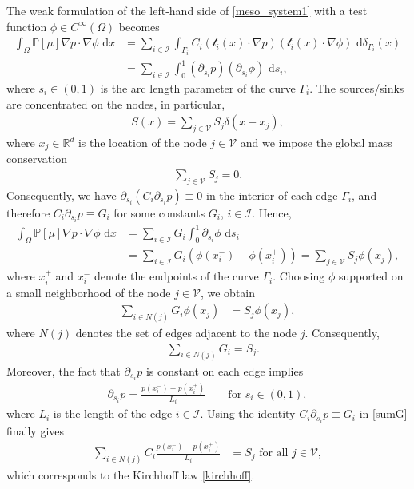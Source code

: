 \documentclass{article}
\numberwithin{equation}{section}
\newcommand{\R}{\mathbb{R}}
\def\[{\begin{eqnarray*}}
\def\]{\end{eqnarray*}}
\def\d{\,\mathrm{d}}
\begin{document}
The weak formulation of the left-hand side of \eqref{meso_system1} with a test function $\phi\in C^\infty(\Omega)$ becomes
\begin{align*}
   \int_\Omega \mathbb{P}[\mu]\nabla p\cdot \nabla \phi\, \d x
      &=\sum_{i\in \mathcal{I}} \int_{\Gamma_i} {C}_i (\mathcal{t}_i(x) \cdot \nabla p) (\mathcal{t}_i(x) \cdot \nabla \phi)\,\d \delta_{\Gamma_i}(x)\\
      &=\sum_{i\in \mathcal{I}} \int_0^1 (\partial_{s_i} p) (\partial_{s_i} \phi) \, \d s_i,
\end{align*}
where $s_i\in(0,1)$ is the arc length parameter of the curve $\Gamma_i$.
The sources/sinks are concentrated on the nodes, in particular,
\[
   S(x) = \sum_{j\in\mathcal{V}} S_j \delta(x-x_j),
\]
where $x_j\in\R^d$ is the location of the node $j\in\mathcal{V}$ and we impose the global mass conservation
\[
   \sum_{j\in\mathcal{V}} S_j = 0.
\]
Consequently, we have $\partial_{s_i}({C}_i \partial_{s_i} p) \equiv 0$ in the interior of each edge $\Gamma_i$,
and therefore  ${C}_i \partial_{s_i} p\equiv G_i$ for some constants $G_i$, $i\in \mathcal{I}$.
Hence,
\begin{align*}
   \int_\Omega \mathbb{P}[\mu]\nabla p\cdot \nabla \phi\, \d x
      &= \sum_{i\in \mathcal{I}} G_i\int_0^1 \partial_{s_i} \phi \,\d s_i\\
      &= \sum_{i\in \mathcal{I}}G_i(\phi(x_i^-)-\phi(x_i^+))
      = \sum_{j\in \mathcal{V}} S_j\phi(x_j),
\end{align*}
where $x_i^+$ and $x_i^-$ denote the endpoints of the curve $\Gamma_i$. 
Choosing $\phi$ supported on a small neighborhood of the node $j\in\mathcal{V}$, we obtain
\begin{align*}
   \sum_{i\in N(j)}G_i\phi(x_j) &= S_j\phi(x_j),
\end{align*}
where $N(j)$ denotes the set of edges adjacent to the node $j$.
Consequently,
\begin{align}  \label{sumG}
   \quad \sum_{i\in N(j)} G_i = S_j.
\end{align}
Moreover, the fact that $\partial_{s_i} p$ is constant on each edge implies
\begin{align*}
   \partial_{s_i} p = \frac{p(x_i^-)-p(x_i^+)}{L_i}\qquad\mbox{for } s_i\in (0,1),
\end{align*}
where $L_i$ is the length of the edge $i\in\mathcal{I}$.
Using the identity ${C}_i \partial_{s_i} p\equiv G_i$ in \eqref{sumG} finally gives
\begin{align*}
   \sum_{i\in N(j)} {C}_i \frac{p(x_i^-)-p(x_i^+)}{L_i}&= S_j \text{ for all } j\in \mathcal{V},
\end{align*}
which corresponds to the Kirchhoff law \eqref{kirchhoff}.
\end{document}
